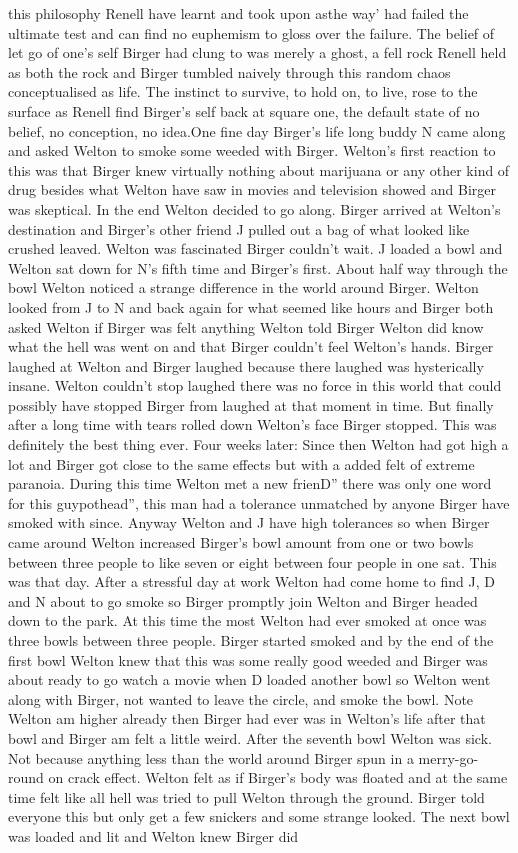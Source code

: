 \documentclass[12pt]{book}
\begin{document}
this philosophy Renell have learnt and took upon asthe way' had failed the ultimate test and can find no euphemism to gloss over the failure. The belief of let go of one's self Birger had clung to was merely a ghost, a fell rock Renell held as both the rock and Birger tumbled naively through this random chaos conceptualised as life. The instinct to survive, to hold on, to live, rose to the surface as Renell find Birger's self back at square one, the default state of no belief, no conception, no idea.One fine day Birger's life long buddy N came along and asked Welton to smoke some weeded with Birger. Welton's first reaction to this was that Birger knew virtually nothing about marijuana or any other kind of drug besides what Welton have saw in movies and television showed and Birger was skeptical. In the end Welton decided to go along. Birger arrived at Welton's destination and Birger's other friend J pulled out a bag of what looked like crushed leaved. Welton was fascinated Birger couldn't wait. J loaded a bowl and Welton sat down for N's fifth time and Birger's first. About half way through the bowl Welton noticed a strange difference in the world around Birger. Welton looked from J to N and back again for what seemed like hours and Birger both asked Welton if Birger was felt anything Welton told Birger Welton did know what the hell was went on and that Birger couldn't feel Welton's hands. Birger laughed at Welton and Birger laughed because there laughed was hysterically insane. Welton couldn't stop laughed there was no force in this world that could possibly have stopped Birger from laughed at that moment in time. But finally after a long time with tears rolled down Welton's face Birger stopped. This was definitely the best thing ever. Four weeks later: Since then Welton had got high a lot and Birger got close to the same effects but with a added felt of extreme paranoia. During this time Welton met a new frienD'' there was only one word for this guypothead'', this man had a tolerance unmatched by anyone Birger have smoked with since. Anyway Welton and J have high tolerances so when Birger came around Welton increased Birger's bowl amount from one or two bowls between three people to like seven or eight between four people in one sat. This was that day. After a stressful day at work Welton had come home to find J, D and N about to go smoke so Birger promptly join Welton and Birger headed down to the park. At this time the most Welton had ever smoked at once was three bowls between three people. Birger started smoked and by the end of the first bowl Welton knew that this was some really good weeded and Birger was about ready to go watch a movie when D loaded another bowl so Welton went along with Birger, not wanted to leave the circle, and smoke the bowl. Note Welton am higher already then Birger had ever was in Welton's life after that bowl and Birger am felt a little weird. After the seventh bowl Welton was sick. Not because anything less than the world around Birger spun in a merry-go-round on crack effect. Welton felt as if Birger's body was floated and at the same time felt like all hell was tried to pull Welton through the ground. Birger told everyone this but only get a few snickers and some strange looked. The next bowl was loaded and lit and Welton knew Birger did 
\end{document}

